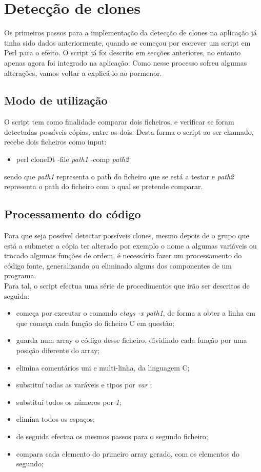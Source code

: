 \chapter{Detecção de clones}\label{chap clonedt}
\minitoc

Os primeiros passos para a implementação da detecção de clones na aplicação já tinha sido dados anteriormente, quando se começou por escrever um script em Perl para o efeito. O script já foi descrito em secções anteriores, no entanto apenas agora foi integrado na aplicação. Como nesse processo sofreu algumas alterações, vamos voltar a explicá-lo ao pormenor.

\section{Modo de utilização}
O script tem como finalidade comparar dois ficheiros, e verificar se foram detectadas possíveis cópias, entre os dois. Desta forma o script ao ser chamado, recebe dois ficheiros como input:
\begin{itemize}
\item perl cloneDt -file \textit{path1} -comp \textit{path2}
\end{itemize}
sendo que \textit{path1} representa o path do ficheiro que se está a testar e \textit{path2} representa o path do ficheiro com o qual se pretende comparar.\\

\section{Processamento do código}
Para que seja possível detectar possíveis clones, mesmo depois de o grupo que está a submeter a cópia ter alterado por exemplo o nome a algumas variáveis ou trocado algumas funções de ordem, é necessário fazer um processamento do código fonte, generalizando ou eliminado alguns dos componentes de um programa.\\
Para tal, o script efectua uma série de procedimentos que irão ser descritos de seguida:
\begin{itemize}
\item começa por executar o comando \textit{ctags -x path1}, de forma a obter a linha em que começa cada função do ficheiro C em questão;
\item guarda num array o código desse ficheiro, dividindo cada função por uma posição diferente do array;
\item elimina comentários uni e multi-linha, da linguagem C;
\item substituí todas as varáveis e tipos por \textit{var} ;
\item substituí todos os números por \textit{1};
\item elimina todos os espaços;
\item de seguida efectua os mesmos passos para o segundo ficheiro;
\item compara cada elemento do primeiro array gerado, com os elementos do segundo;
\end{itemize}

